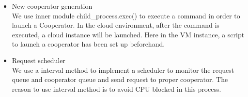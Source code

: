 \documentclass[JIP]{ipsj}
\begin{document}
\begin{itemize}
	\item New cooperator generation \\
	We use inner module child\_process.exec() to execute a command in order to launch a Cooperator.
	In the cloud environment, after the command is executed, a cloud instance will be launched. Here in the VM instance, a script to launch a cooperator has been set up beforehand.

	\item Request scheduler\\
	We use a interval method to implement a scheduler to monitor the request queue and cooperator queue and send request to proper cooperator. The reason to use interval method is to avoid CPU blocked in this process.

\end{itemize}
\end{document}
